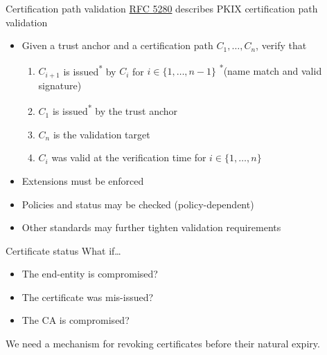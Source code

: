 \begin{frame}{Certification path validation}
  \href{https://datatracker.ietf.org/doc/html/rfc5280}{RFC 5280} describes PKIX certification path validation
  \begin{itemize}[<+(1)->]
    \item Given a trust anchor and a certification path $C_1, \dots, C_n$, verify that
    \begin{enumerate}[<+(1)->]
      \item $C_{i+1}$ is issued\textsuperscript{*} by $C_i$ for $i\in\{1, \dots, n-1\}$ \hfil {\scriptsize \textsuperscript{*}(name match and valid signature)}
      \item $C_1$ is issued\textsuperscript{*} by the trust anchor
      \item $C_n$ is the validation target
      \item $C_i$ was valid at the verification time for $i\in\{1, \dots, n\}$
    \end{enumerate}
    \item Extensions must be enforced
    \item Policies and status may be checked (policy-dependent)
    \item Other standards may further tighten validation requirements
  \end{itemize}
\end{frame}

\begin{frame}{Certificate status}
  What if\dots
  \begin{itemize}[<+(1)->]
    \item The end-entity is compromised?
    \item The certificate was mis-issued?
    \item The CA is compromised?
  \end{itemize}

  \vspace*{1em}

  \pause
  We need a mechanism for revoking certificates before their natural expiry.
\end{frame}

